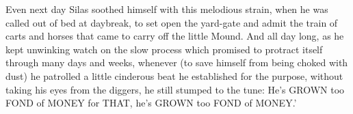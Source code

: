 Even next day Silas soothed himself with this melodious strain, when he
was called out of bed at daybreak, to set open the yard-gate and admit
the train of carts and horses that came to carry off the little Mound.
And all day long, as he kept unwinking watch on the slow process which
promised to protract itself through many days and weeks, whenever
(to save himself from being choked with dust) he patrolled a little
cinderous beat he established for the purpose, without taking his eyes
from the diggers, he still stumped to the tune: He’s GROWN too FOND of
MONEY for THAT, he’s GROWN too FOND of MONEY.’



